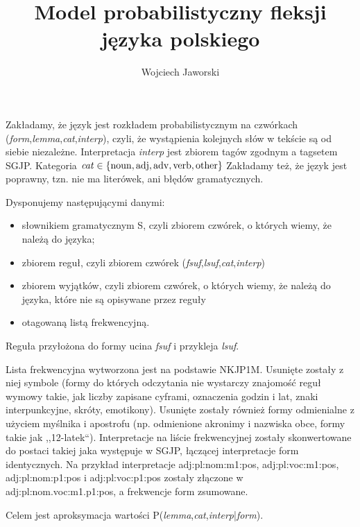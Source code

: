 \documentclass{article}
\title{Model probabilistyczny fleksji języka polskiego}
\author{Wojciech Jaworski}
\newcommand{\form}{{\it form}}
\newcommand{\lemma}{{\it lemma}}
\newcommand{\cat}{{\it cat}}
\newcommand{\interp}{{\it interp}}
\newcommand{\fsuf}{{\it fsuf}}
\newcommand{\lsuf}{{\it lsuf}}
\begin{document}
\maketitle

Zakładamy, że język jest rozkładem probabilistycznym na czwórkach (\form,\lemma,\cat,\interp),
czyli, że wystąpienia kolejnych słów w tekście są od siebie niezależne.
Interpretacja \interp{} jest zbiorem tagów zgodnym a tagsetem SGJP.
Kategoria $\cat \in \{ {\rm noun}, {\rm adj}, {\rm adv}, {\rm verb}, {\rm other} \}$
Zakładamy też, że język jest poprawny, tzn. nie ma literówek, ani błędów gramatycznych.

Dysponujemy następującymi danymi: 
\begin{itemize}
\item słownikiem gramatycznym S, czyli zbiorem czwórek, o których wiemy, że należą do języka;
\item zbiorem reguł, czyli zbiorem czwórek (\fsuf,\lsuf,\cat,\interp)
\item zbiorem wyjątków, czyli zbiorem czwórek, o których wiemy, że należą do języka, które nie są opisywane przez reguły
\item otagowaną listą frekwencyjną.
\end{itemize}
Reguła przyłożona do formy ucina \fsuf{} i przykleja \lsuf.

Lista frekwencyjna wytworzona jest na podstawie NKJP1M. Usunięte zostały z niej symbole 
(formy do których odczytania nie wystarczy znajomość reguł wymowy takie, jak liczby zapisane cyframi, oznaczenia godzin i lat,
znaki interpunkcyjne, skróty, emotikony). Usunięte zostały również formy odmienialne z użyciem myślnika i apostrofu 
(np. odmienione akronimy i nazwiska obce, formy takie jak ,,12-latek``). 
Interpretacje na liście frekwencyjnej zostały skonwertowane do postaci takiej jaka występuje w SGJP, 
łączącej interpretacje form identycznych. Na przykład interpretacje adj:pl:nom:m1:pos, adj:pl:voc:m1:pos, adj:pl:nom:p1:pos i adj:pl:voc:p1:pos 
zostały złączone w adj:pl:nom.voc:m1.p1:pos, a frekwencje form zsumowane.

Celem jest aproksymacja wartości P(\lemma,\cat,\interp|\form).


\end{document}
